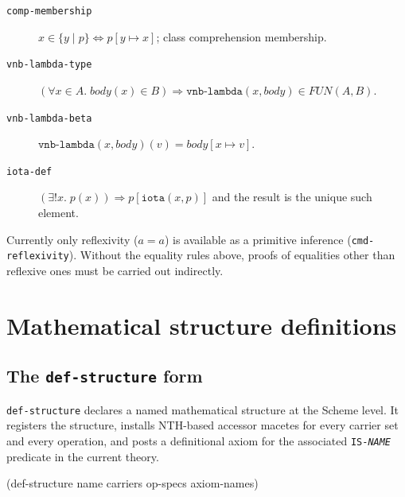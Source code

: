 \documentclass{amsbook}[openany]
\theoremstyle{definition}
\theoremstyle{remark}
\theoremstyle{remark}
\begin{document}
\begin{description}
\item[\texttt{comp-membership}]
  $x \in \{y \mid p\} \Leftrightarrow p[y \mapsto x]$;
  class comprehension membership.

\item[\texttt{vnb-lambda-type}]
  $(\forall x \in A.\;\mathit{body}(x) \in B) \Rightarrow
   \texttt{vnb-lambda}(x, \mathit{body}) \in \mathit{FUN}(A,B)$.

\item[\texttt{vnb-lambda-beta}]
  $\texttt{vnb-lambda}(x, \mathit{body})(v) = \mathit{body}[x \mapsto v]$.

\item[\texttt{iota-def}]
  $(\exists! x.\;p(x)) \Rightarrow p[\texttt{iota}(x, p)]$
  and the result is the unique such element.

\end{description}

\noindent
Currently only reflexivity ($a = a$) is available as a primitive inference
(\texttt{cmd-reflexivity}).  Without the equality rules above, proofs of
equalities other than reflexive ones must be carried out indirectly.

\section{Mathematical structure definitions}

\subsection{The \texttt{def-structure} form}

\texttt{def-structure} declares a named mathematical structure at the
Scheme level.  It registers the structure, installs NTH-based accessor
macetes for every carrier set and every operation, and posts a
definitional axiom for the associated \texttt{IS-\textit{NAME}} predicate
in the current theory.

\begin{VNBcode}
(def-structure name carriers op-specs axiom-names)
\end{VNBcode}
\end{document}
